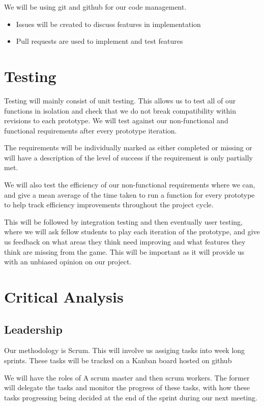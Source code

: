 \documentclass{article}
\begin{document}
We will be using git and github for our code management.
\begin{itemize}
	\item  Issues will be created to discuss features in implementation
	\item Pull requests are used to implement and test features
\end{itemize}

\section{Testing}%
\label{sec:test}
Testing will mainly consist of unit testing. This allows us to test all of our functions in isolation and check that we do not break compatibility within revisions to each prototype. We will test against our non-functional and functional requirements after every prototype iteration.

The requirements will be individually marked as either completed or missing or will have a description of the level of success if the requirement is only partially met.

We will also test the efficiency of our non-functional requirements where we can, and give a mean average of the time taken to run a function for every prototype to help track efficiency improvements throughout the project cycle.

This will be followed by integration testing and then eventually user testing, where we will ask fellow students to play each iteration of the prototype, and give us feedback on what areas they think need improving and what features they think are missing from the game. This will be important as it will provide us with an unbiased opinion on our project.

\section{Critical Analysis}%
\label{sec:anal}

\subsection{Leadership}%
\label{subsec:leadership}
Our methodology is Scrum. This will involve us assiging tasks into week long
sprints. These tasks will be tracked on a Kanban board hosted on github

We will have the roles of A scrum master and then scrum workers. The former will
delegate the tasks and monitor the progress of these tasks, with how these tasks
progressing being decided at the end of the sprint during our next meeting.
\end{document}
